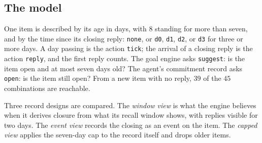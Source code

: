 \documentclass[11pt]{article}
\newcommand{\code}[1]{\texttt{#1}}
\theoremstyle{definition}
\theoremstyle{plain}
\begin{document}
\subsection{The model}

One item is described by its age in days, with $8$ standing for more than seven, and by the time
since its closing reply: \code{none}, or \code{d0}, \code{d1}, \code{d2}, or \code{d3} for three or
more days. A day passing is the action \code{tick}; the arrival of a closing reply is the action
\code{reply}, and the first reply counts. The goal engine asks \code{suggest}: is the item open and
at most seven days old? The agent's commitment record asks \code{open}: is the item still open?
From a new item with no reply, $39$ of the $45$ combinations are reachable.

Three record designs are compared. The \emph{window view} is what the engine believes when it
derives closure from what its recall window shows, with replies visible for two days. The
\emph{event view} records the closing as an event on the item. The \emph{capped view} applies the
seven-day cap to the record itself and drops older items.
\end{document}
